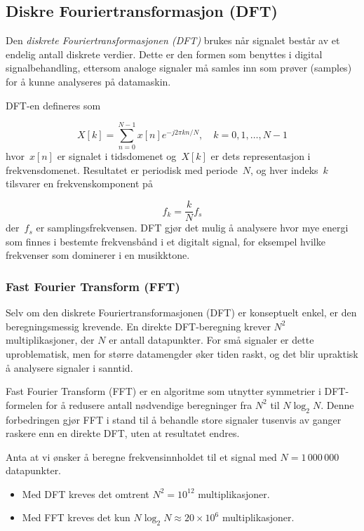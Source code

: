 \subsection{Diskre Fouriertransformasjon (DFT)}
Den \emph{diskrete Fouriertransformasjonen (DFT)} brukes når signalet består av et endelig antall diskrete verdier. Dette er den formen som benyttes i digital signalbehandling, ettersom analoge signaler må samles inn som prøver (samples) for å kunne analyseres på datamaskin.

DFT-en defineres som

\begin{equation}
    X[k] = \sum_{n=0}^{N-1} x[n] e^{-j2\pi kn/N}, \quad k = 0, 1, \dots, N-1
\end{equation}
hvor~$x[n]$ er signalet i tidsdomenet og~$X[k]$ er dets representasjon i frekvensdomenet. Resultatet er periodisk med periode~$N$, og hver indeks~$k$ tilsvarer en frekvenskomponent på

\begin{equation}
    f_k = \frac{k}{N} f_s
\end{equation}
der~$f_s$ er samplingsfrekvensen. DFT gjør det mulig å analysere hvor mye energi som finnes i bestemte frekvensbånd i et digitalt signal, for eksempel hvilke frekvenser som dominerer i en musikktone.

\subsubsection{Fast Fourier Transform (FFT)}
Selv om den diskrete Fouriertransformasjonen (DFT) er konseptuelt enkel, er den beregningsmessig krevende. 
En direkte DFT-beregning krever $N^2$ multiplikasjoner, der $N$ er antall datapunkter. 
For små signaler er dette uproblematisk, men for større datamengder øker tiden raskt, og det blir upraktisk å analysere signaler i sanntid. 

Fast Fourier Transform (FFT) er en algoritme som utnytter symmetrier i DFT-formelen for å redusere antall nødvendige beregninger fra $N^2$ til $N\log_2 N$. 
Denne forbedringen gjør FFT i stand til å behandle store signaler tusenvis av ganger raskere enn en direkte DFT, uten at resultatet endres.

Anta at vi ønsker å beregne frekvensinnholdet til et signal med $N=1\,000\,000$ datapunkter.

\begin{itemize}
    \item Med DFT kreves det omtrent $N^2 = 10^{12}$ multiplikasjoner.
    \item Med FFT kreves det kun $N\log_2 N \approx 20 \times 10^6$ multiplikasjoner.
\end{itemize}


